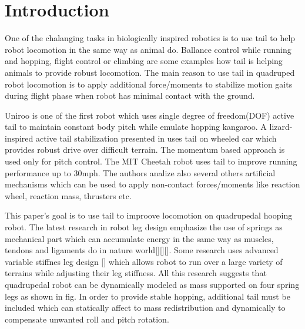 \section{Introduction}\label{sec:introduction}

One of the chalanging tasks in biologically inspired robotics is to use tail to help robot locomotion in the same way as animal do. Ballance control while running and hopping, flight control or climbing are some examples how tail is helping animals to provide robust locomotion. The main reason to use tail in quadruped robot locomotion is to apply additional force/moments to stabilize motion gaits during flight phase when robot has minimal contact with the ground. 

Uniroo \cite{zeglin1991uniroo} is one of the first robot which uses single degree of freedom(DOF) active tail to maintain constant body pitch while emulate hopping kangaroo. A lizard-inspired active tail stabilization presented in \cite{conf/iros/Chang-SiuLTF11} uses tail on wheeled car which provides robust drive over difficult terrain. The momentum based approach is used only for pitch control. The MIT Cheetah robot \cite{DBLP:conf/iros/2012} uses tail to improve running performance up to 30mph. The authors analize also several others artificial mechanisms which can be used to apply non-contact forces/moments like reaction wheel, reaction mass, thrusters etc. 

This paper's goal is to use tail to improove locomotion on quadrupedal hooping robot. The latest research in robot leg design emphasize the use of springs as mechanical part which can accumulate energy in the same way as muscles, tendons and ligaments do in nature world[][][]. Some research uses advanced variable stiffnes leg design [] which allows robot to run over a large variety of terrains while adjusting their leg stiffness. All this research suggests that quadrupedal robot can be dynamically modeled as mass supported on four spring legs as shown in fig. In order to provide stable hopping, additional tail must be included which can statically affect to mass redistribution and dynamically to compensate unwanted roll and pitch rotation. 


